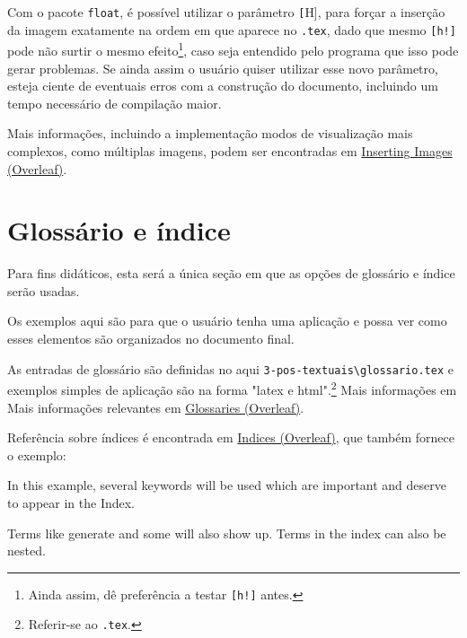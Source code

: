 Com o pacote \texttt{float}, é possível utilizar o parâmetro \texttt[H], para forçar a inserção da imagem exatamente na ordem em que aparece no \texttt{.tex}, dado que mesmo \texttt{[h!]} pode não surtir o mesmo efeito\footnote{Ainda assim, dê preferência a testar \texttt{[h!]} antes.}, caso seja entendido pelo programa que isso pode gerar problemas. Se ainda assim o usuário quiser utilizar esse novo parâmetro, esteja ciente de eventuais erros com a construção do documento, incluindo um tempo necessário de compilação maior.

Mais informações, incluindo a implementação modos de visualização mais complexos, como múltiplas imagens, podem ser encontradas em \href{https://www.overleaf.com/learn/latex/Inserting_Images}{Inserting Images (Overleaf)}.

\section{Glossário e índice}
Para fins didáticos, esta será a única seção em que as opções de glossário e índice serão usadas.

Os exemplos aqui são para que o usuário tenha uma aplicação e possa ver como esses elementos são organizados no documento final.

As entradas de glossário são definidas no aqui \texttt{3-pos-textuais\textbackslash glossario.tex} e exemplos simples de aplicação são na forma "\gls{latex} e \gls{html}".\footnote{Referir-se ao \texttt{.tex}.} Mais informações em Mais informações relevantes em \href{https://www.overleaf.com/learn/latex/Glossaries}{Glossaries (Overleaf)}.

Referência sobre índices é encontrada em \href{https://www.overleaf.com/learn/latex/Indices}{Indices (Overleaf)}, que também fornece o exemplo:

\begin{citacao}
In this example, several keywords will be used 
which are important and deserve to appear in the Index.

Terms like generate and some will also 
show up. Terms in the index can also be nested.
\end{citacao}
